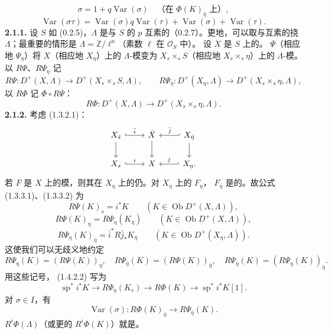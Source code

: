 \[\sigma=1+q\operatorname{Var}(\sigma)\quad\text{（在 $\Phi(K)_{\bar\eta}$ 上）},\tag{1.4.3.3}\]
\[\operatorname{Var}(\sigma\tau)=\operatorname{Var}(\sigma)q\operatorname{Var}(\tau)+\operatorname{Var}(\sigma)+\operatorname{Var}(\tau).\tag{1.4.3.4}\]
\textbf{2.1.1.} 设 $S$ 如 (0.2.5)，$\Lambda$ 是与 $S$ 的 $p$ 互素的（0.2.7）。更地，可以取与互素的挠 $\Lambda$；最重要的情形是 $\Lambda=\mathbb Z/\ell^n$（素数 $\ell$ 在 $\mathscr O_S$ 中）。
设 $X$ 是 $S$ 上的。 $\Psi$（相应地 $\Psi_\eta$）将 $X$（相应地 $X_\eta$）上的 $\Lambda$-模变为 $X_s\times_sS$（相应地 $X_s\times_s\eta$）上的 $\Lambda$-模。以 $R\Psi$、$R\Psi_\eta$ 记
\[
R\Psi:D^+(X,\Lambda)\longrightarrow D^+(X_s\times_sS,\Lambda),\qquad
R\Psi_\eta:D^+(X_\eta,\Lambda)\longrightarrow D^+(X_s\times_s\eta,\Lambda),
\]
以 $R\Phi$ 记 $\Phi\circ R\Psi$：
\[R\Phi:D^+(X,\Lambda)\longrightarrow D^+(X_s\times_s\eta,\Lambda).\]
\textbf{2.1.2.} 考虑 (1.3.2.1)：
\[
\begin{tikzcd}
X_{\bar s}\arrow[r,hook,"\bar i"]\arrow[d]&\bar X\arrow[d]&X_{\bar\eta}\arrow[l,hook',"\bar j"']\arrow[d]\\
X_s\arrow[r,hook,"i"]&X&X_\eta\arrow[l,hook',"j"'].
\end{tikzcd}
\]
若 $F$ 是 $X$ 上的模，则其在 $X_\eta$ 上的仍。对 $X_\eta$ 上的 $F_\eta$， $F_{\bar\eta}$ 是的。故公式 (1.3.3.1)、(1.3.3.2) 为
\[R\Psi(K)_s=i^*K\qquad(K\in\operatorname{Ob}D^+(X,\Lambda)),\tag{2.1.2.1}\]
\[R\Psi(K)_\eta=R\Psi_\eta(K_\eta)\qquad(K\in\operatorname{Ob}D^+(X,\Lambda)),\tag{2.1.2.2}\]
\[R\Psi_\eta(K)_{\bar\eta}=\bar i^*R\bar j_*K_{\bar\eta}\qquad(K\in\operatorname{Ob}D^+(X_\eta,\Lambda)).\tag{2.1.2.3}\]
这使我们可以无歧义地约定
\[
R\Psi_\eta(K)=(R\Psi(K))_\eta,\quad R\Psi_{\bar\eta}(K)=(R\Psi(K))_{\bar\eta},\quad R\Psi_{\bar\eta}(K)=(R\Psi_\eta(K))_{\bar\eta}.
\]
用这些记号， (1.4.2.2) 写为
\[\operatorname{sp}^*i^*K\longrightarrow R\Psi_\eta(K_s)\longrightarrow R\Phi(K)\longrightarrow\operatorname{sp}^*i^*K[1].\tag{2.1.2.4}\]
对 $\sigma\in I$，有
\[\operatorname{Var}(\sigma):R\Phi(K)_{\bar\eta}\longrightarrow R\Psi_{\bar\eta}(K).\tag{2.1.2.5}\]
 $R^i\Phi(\Lambda)$（或更的 $R^i\Phi(K)$）就是。

